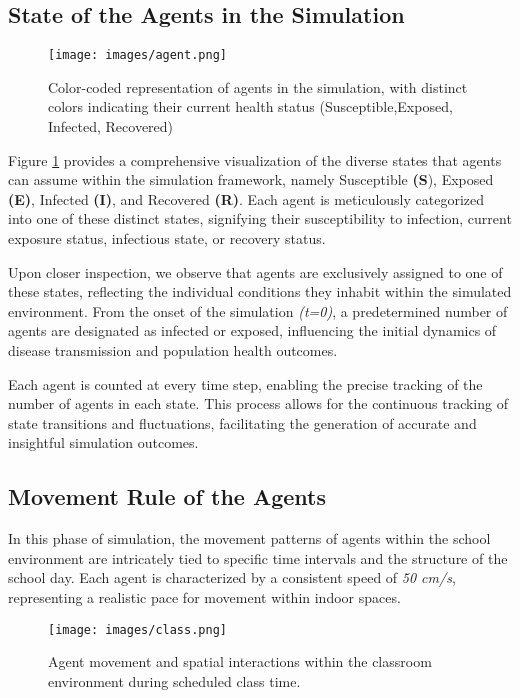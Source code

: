  \subsection{State of the Agents in the Simulation}
 \begin{figure}[H]
 	\centering
 	\texttt{[image: images/agent.png]}
 	\caption{Color-coded representation of agents in the simulation, with distinct colors indicating their current
 		health status (Susceptible,Exposed, Infected, Recovered)}
 	\label{agent}
 \end{figure}
 
 
 Figure \ref{agent} provides a comprehensive visualization of the diverse states that agents can assume within the simulation framework, namely Susceptible\textbf{ (S}), Exposed \textbf{(E)}, Infected\textbf{ (I)}, and Recovered\textbf{ (R)}. Each agent is meticulously categorized into one of these distinct states, signifying their susceptibility to infection, current exposure status, infectious state, or recovery status.
 
 Upon closer inspection, we observe that agents are exclusively assigned to one of these states, reflecting the individual conditions they inhabit within the simulated environment. From the onset of the simulation \textit{(t=0)}, a predetermined number of agents are designated as infected or exposed, influencing the initial dynamics of disease transmission and population health outcomes.
 
 Each agent is counted at every time step, enabling the precise tracking of the number of agents in each state. This process allows for the continuous tracking of state transitions and fluctuations, facilitating the generation of accurate and insightful simulation outcomes. 
 
 \subsection{Movement Rule of the Agents}
 In this phase of simulation, the movement patterns of agents within the school environment are intricately tied to specific time intervals and the structure of the school day. Each agent is characterized by a consistent speed of \textit{50 cm/s}, representing a realistic pace for movement within indoor spaces.
 \begin{figure}[H]
 	\centering 
 	\texttt{[image: images/class.png]}
 	\caption{Agent movement and spatial interactions within the classroom environment during scheduled class time.}
 	\label{classtime}
 \end{figure}
 
